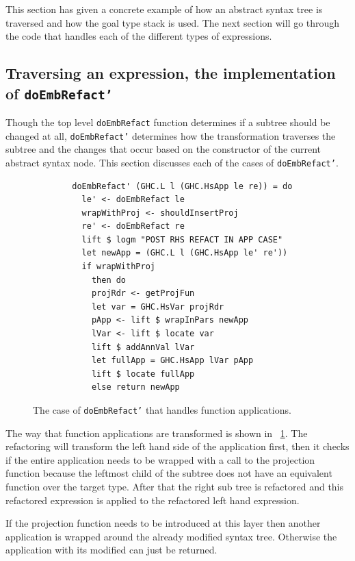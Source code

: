 This section has given a concrete example of how an abstract syntax tree is traversed and how the goal type stack is used. The next section will go through the code that handles each of the different types of expressions.

\subsection{Traversing an expression, the implementation of \texttt{doEmbRefact'}}

Though the top level \texttt{doEmbRefact} function determines if a subtree should be changed at all, \texttt{doEmbRefact'} determines how the transformation traverses the subtree and the changes that occur based on the constructor of the current abstract syntax node. This section discusses each of the cases of \texttt{doEmbRefact'}.

\begin{figure}[t]
\begin{lstlisting}
        doEmbRefact' (GHC.L l (GHC.HsApp le re)) = do
          le' <- doEmbRefact le
          wrapWithProj <- shouldInsertProj       
          re' <- doEmbRefact re
          lift $ logm "POST RHS REFACT IN APP CASE"
          let newApp = (GHC.L l (GHC.HsApp le' re'))
          if wrapWithProj
            then do
            projRdr <- getProjFun
            let var = GHC.HsVar projRdr
            pApp <- lift $ wrapInPars newApp
            lVar <- lift $ locate var
            lift $ addAnnVal lVar
            let fullApp = GHC.HsApp lVar pApp
            lift $ locate fullApp
            else return newApp
\end{lstlisting}
\caption{The case of \texttt{doEmbRefact'} that handles function applications.}
\label{embRefactApp}
\end{figure}

The way that function applications are transformed is shown in \DIFdelbegin {}\DIFdelend \DIFaddbegin {}\DIFaddend ~\ref{embRefactApp}. The refactoring will transform the left hand side of the application first, then it checks if the entire application needs to be wrapped with a call to the projection function because the leftmost child of the subtree does not have an equivalent function over the target type. After that the right sub tree is refactored and this refactored expression is applied to the refactored left hand expression.

If the projection function needs to be introduced at this layer then another application is wrapped around the already modified syntax tree. Otherwise the application with its modified \DIFdelbegin {}\DIFdelend \DIFaddbegin {}\DIFaddend can just be returned.

